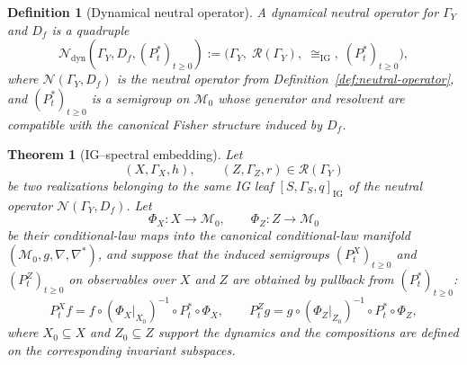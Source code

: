 \documentclass[11pt]{article}
\newtheorem{definition}{Definition}
\newtheorem{theorem}{Theorem}
\newcommand{\Rcal}{\mathcal{R}}
\newcommand{\Mcal}{\mathcal{M}}
\newcommand{\Ncal}{\mathcal{N}}
\begin{document}
\begin{definition}[Dynamical neutral operator]
\label{def:dynamical-neutral-operator}
A \emph{dynamical neutral operator} for $\Gamma_Y$ and $D_f$ is a
quadruple
\[
  \Ncal_{\mathrm{dyn}}(\Gamma_Y,D_f,(P_t^\ast)_{t\ge 0})
  :=
  \bigl(
    \Gamma_Y,\;
    \Rcal(\Gamma_Y),\;
    \cong_{\mathrm{IG}},\;
    (P_t^\ast)_{t\ge 0}
  \bigr),
\]
where $\Ncal(\Gamma_Y,D_f)$ is the neutral operator from
Definition~\ref{def:neutral-operator}, and $(P_t^\ast)_{t\ge 0}$ is a
semigroup on $\Mcal_0$ whose generator and resolvent are compatible with
the canonical Fisher structure induced by $D_f$.
\end{definition}

\begin{theorem}[IG--spectral embedding]
\label{thm:ig-spectral-embedding}
Let
\[
  (X,\Gamma_X,h),
  \qquad
  (Z,\Gamma_Z,r)
  \in \Rcal(\Gamma_Y)
\]
be two realizations belonging to the same IG leaf
$[S,\Gamma_S,q]_{\mathrm{IG}}$ of the neutral operator
$\Ncal(\Gamma_Y,D_f)$. Let
\[
  \Phi_X:X\to\Mcal_0,
  \qquad
  \Phi_Z:Z\to\Mcal_0
\]
be their conditional-law maps into the canonical conditional-law manifold
$(\Mcal_0,g,\nabla,\nabla^\ast)$, and suppose that the induced semigroups
$(P_t^X)_{t\ge 0}$ and $(P_t^Z)_{t\ge 0}$ on observables over $X$ and $Z$
are obtained by pullback from $(P_t^\ast)_{t\ge 0}$:
\begin{equation}
  P_t^X f
  = f\circ (\Phi_X|_{X_0})^{-1}\circ P_t^\ast\circ \Phi_X,
  \qquad
  P_t^Z g
  = g\circ (\Phi_Z|_{Z_0})^{-1}\circ P_t^\ast\circ \Phi_Z,
  \label{eq:pullback-semigroups}
\end{equation}
where $X_0\subseteq X$ and $Z_0\subseteq Z$ support the dynamics and the
compositions are defined on the corresponding invariant subspaces.


\end{theorem}
\end{document}
